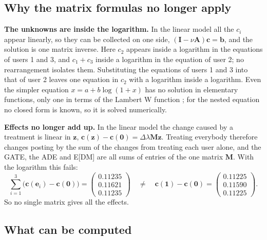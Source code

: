 \documentclass[11pt]{article}
\newcommand{\one}{\mathbf{1}}
\newcommand{\vzero}{\mathbf{0}}
\newcommand{\vc}{\boldsymbol{c}}
\newcommand{\vz}{\boldsymbol{z}}
\newcommand{\vb}{\boldsymbol{b}}
\newcommand{\ve}{\boldsymbol{e}}
\newcommand{\mA}{\mathbf{A}}
\newcommand{\mM}{\mathbf{M}}
\newcommand{\mI}{\mathbf{I}}
\begin{document}
\subsection{Why the matrix formulas no longer apply}

\textbf{The unknowns are inside the logarithm.}  In the linear model all the $c_i$ appear linearly, so they can be collected on one side, $(\mI - \nu\mA)\vc = \vb$, and the solution is one matrix inverse.  Here $c_2$ appears inside a logarithm in the equations of users 1 and 3, and $c_1 + c_3$ inside a logarithm in the equation of user 2; no rearrangement isolates them.  Substituting the equations of users 1 and 3 into that of user 2 leaves one equation in $c_2$ with a logarithm inside a logarithm.  Even the simpler equation $x = a + b\log(1 + x)$ has no solution in elementary functions, only one in terms of the Lambert W function \cite{corless1996}; for the nested equation no closed form is known, so it is solved numerically.

\textbf{Effects no longer add up.}  In the linear model the change caused by a treatment is linear in $\vz$, $\vc(\vz) - \vc(\vzero) = \Delta\lambda\mM\vz$.  Treating everybody therefore changes posting by the sum of the changes from treating each user alone, and the GATE, the ADE and E[DM] are all sums of entries of the one matrix $\mM$.  With the logarithm this fails:
\[
\sum_{i=1}^{3} \bigl(\vc(\ve_i) - \vc(\vzero)\bigr) = \begin{pmatrix} 0.11235 \\ 0.11621 \\ 0.11235 \end{pmatrix}
\quad\ne\quad
\vc(\one) - \vc(\vzero) = \begin{pmatrix} 0.11225 \\ 0.11590 \\ 0.11225 \end{pmatrix}.
\]
So no single matrix gives all the effects.

\subsection{What can be computed}
\end{document}
